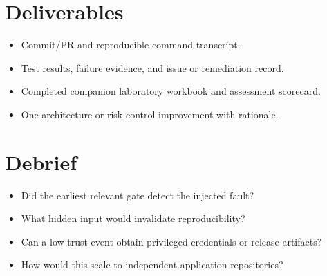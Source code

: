 \documentclass[11pt,letterpaper]{article}
\begin{document}
\section{Deliverables}
\begin{itemize}
\item Commit/PR and reproducible command transcript.
\item Test results, failure evidence, and issue or remediation record.
\item Completed companion laboratory workbook and assessment scorecard.
\item One architecture or risk-control improvement with rationale.
\end{itemize}
\section{Debrief}
\begin{itemize}
\item Did the earliest relevant gate detect the injected fault?
\item What hidden input would invalidate reproducibility?
\item Can a low-trust event obtain privileged credentials or release artifacts?
\item How would this scale to independent application repositories?
\end{itemize}
\end{document}
